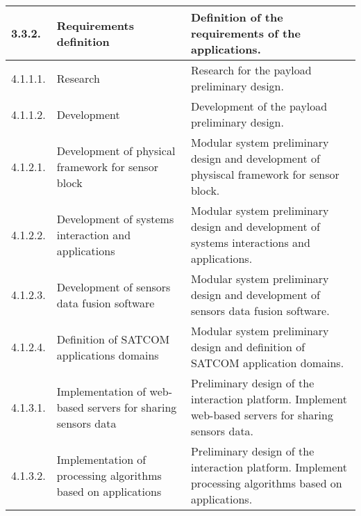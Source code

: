 \begin{longtable}[H]{l >{\raggedright\arraybackslash}p{4cm} p{8cm}}
	\midrule
	
	3.3.2. & Requirements definition & Definition of the requirements of the applications.\vspace{0.2cm} \\
	
	\midrule
	
	4.1.1.1. & Research & Research for the payload preliminary design.\vspace{0.2cm} \\
	
	\midrule
	
	4.1.1.2. & Development & Development of the payload preliminary design.\vspace{0.2cm} \\
	
	\midrule

	4.1.2.1. & Development of physical framework for sensor block & Modular system preliminary design and development of physiscal framework for sensor block.\vspace{0.2cm} \\
	
	\midrule
	
	4.1.2.2. & Development of systems interaction and applications & Modular system preliminary design and development of systems interactions and applications.\vspace{0.2cm} \\
	
	\midrule
	
	4.1.2.3. & Development of sensors data fusion software & Modular system preliminary design and development of sensors data fusion software.\vspace{0.2cm} \\
	
	\midrule
	
	4.1.2.4. & Definition of SATCOM applications domains & Modular system preliminary design and definition of SATCOM application domains.\vspace{0.2cm} \\
	
	\midrule
	
	4.1.3.1. & Implementation of web-based servers for sharing sensors data & Preliminary design of the interaction platform. Implement web-based servers for sharing sensors data.\vspace{0.2cm} \\
	
	\midrule
	
	4.1.3.2. & Implementation of processing algorithms based on applications & Preliminary design of the interaction platform. Implement processing algorithms based on applications.\vspace{0.2cm} \\
	

\end{longtable}
